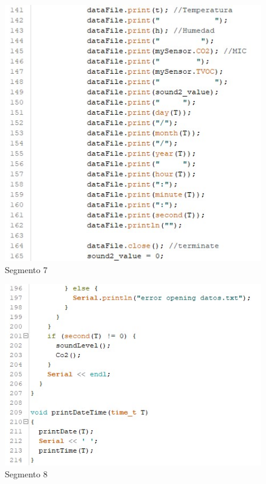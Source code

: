 \begin{flushleft}
    \begin{figure}[H]
        \includegraphics{imagenes/codigo7.jpg}
        \caption*{Segmento 7}
    \end{figure}

    \begin{figure}[H]
        \includegraphics{imagenes/codigo8.jpg}
        \caption*{Segmento 8}
    \end{figure}


\end{flushleft}
